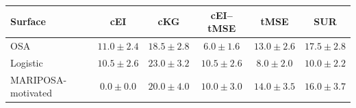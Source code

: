 \begin{tabular}{@{}lccccc@{}}
\toprule
Surface & cEI & cKG & cEI--tMSE & tMSE & SUR \\
\midrule
OSA & $11.0{\pm}2.4$ & $18.5{\pm}2.8$ & $6.0{\pm}1.6$ & $13.0{\pm}2.6$ & $17.5{\pm}2.8$ \\
Logistic & $10.5{\pm}2.6$ & $23.0{\pm}3.2$ & $10.5{\pm}2.6$ & $8.0{\pm}2.0$ & $10.0{\pm}2.2$ \\
MARIPOSA-motivated & $0.0{\pm}0.0$ & $20.0{\pm}4.0$ & $10.0{\pm}3.0$ & $14.0{\pm}3.5$ & $16.0{\pm}3.7$ \\
\bottomrule
\end{tabular}
